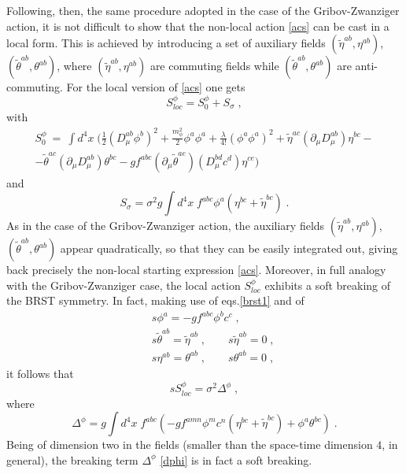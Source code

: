 Following, then, the same procedure adopted in the case of the Gribov-Zwanziger action, it is
not difficult to show that the non-local action \eqref{acs} can be cast in a local form. This
is achieved by introducing  a set of auxiliary fields $(\tilde{\eta}^{ab},\eta^{ab})$,
$(\tilde{\theta}^{ab},\theta^{ab})$, where $(\tilde{\eta}^{ab},\eta^{ab})$ are commuting fields
while  $(\tilde{\theta}^{ab},\theta^{ab})$ are anti-commuting. For the local version of
\eqref{acs} one gets 
\begin{equation}
S_{loc}^{\phi}   =     S_{0}^{\phi} + S_{\sigma}   \;, \label{lphi} 
\end{equation}
with 
\begin{eqnarray}
\label{act0}
S_{0}^{\phi}  ~=~  \int d^4x\; \bigg(  \frac{1}{2}  (D^{ab}_{\mu}\phi^{b})^{2}  + \frac{m^2_{\phi}}{2} \phi^a \phi^a
+  \frac{\lambda}{4!}(\phi^{a}\phi^{a})^{2}
+ \tilde{\eta}^{ac}(\partial_{\mu} D^{ab}_{\mu})\eta^{bc} -
\nonumber \\
-
\tilde{\theta}^{ac}(\partial_{\mu} D^{ab}_{\mu})\theta^{bc}      -
gf^{abc}(\partial_{\mu}\tilde{\theta}^{ae})(D^{bd}_{\mu}c^{d})\eta^{ce}  \bigg)  \;  
\end{eqnarray}
and
\begin{equation}
S_{\sigma}  =  \sigma^{2}g  \int d^4x   \; f^{abc}\phi^{a}(\eta^{bc} + \tilde{\eta}^{bc}) \;.     \label{ss}
\end{equation}
As in the case of the Gribov-Zwanziger action, the auxiliary fields $(\tilde{\eta}^{ab},\eta^{ab})$, $(\tilde{\theta}^{ab},\theta^{ab})$ appear quadratically, so that they can be easily integrated out, giving back precisely the non-local starting expression \eqref{acs}. Moreover, in full analogy with the Gribov-Zwanziger case, the local action $S_{loc}^{\phi}$ exhibits a soft breaking of the BRST symmetry. In fact, making use of eqs.\eqref{brst1} and of 
\begin{eqnarray}
&&
s\phi^{a}=-gf^{abc}\phi^{b}c^{c} \;,    \nonumber \\
&&
s\tilde{\theta}^{ab} = \tilde{\eta}^{ab}\;, \qquad s\tilde{\eta}^{ab} =0\;, \nonumber \\
&&
s\eta^{ab}=\theta^{ab}\;, \qquad s\theta^{ab}=0\;, 
\end{eqnarray}
it follows that 
\begin{equation}
s  S_{loc}^{\phi} = \sigma^2 \Delta^{\phi}   \;, \label{bs}
\end{equation}
 where 
\begin{equation}
 \Delta^{\phi}  = g \int d^4x\; f^{abc} \left( -g f^{amn} \phi^{m} c^n (\eta^{bc} + \tilde{\eta}^{bc}) + \phi^a \theta^{bc}     \right)   \;. 
\label{dphi}
\end{equation}
Being of dimension two in the fields (smaller than the space-time dimension $4$, in general),
the breaking term  $\Delta^{\phi} $ \eqref{dphi} is in fact a soft breaking. 

